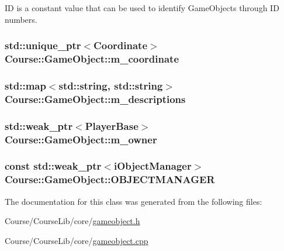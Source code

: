 I\-D is a constant value that can be used to identify Game\-Objects through I\-D numbers. 

\hypertarget{classCourse_1_1GameObject_a00d58f09e2214089825bf53b58f208b7}{
\subsubsection[{m\-\_\-coordinate}]{\setlength{\rightskip}{0pt plus 5cm}std\-::unique\-\_\-ptr$<${\bf Coordinate}$>$ Course\-::\-Game\-Object\-::m\-\_\-coordinate\hspace{0.3cm}{\ttfamily [private]}}}\label{classCourse_1_1GameObject_a00d58f09e2214089825bf53b58f208b7}
\hypertarget{classCourse_1_1GameObject_a9fb3b852a067d9079ef6ca3677b8fe77}{
\subsubsection[{m\-\_\-descriptions}]{\setlength{\rightskip}{0pt plus 5cm}std\-::map$<$std\-::string, std\-::string$>$ Course\-::\-Game\-Object\-::m\-\_\-descriptions\hspace{0.3cm}{\ttfamily [private]}}}\label{classCourse_1_1GameObject_a9fb3b852a067d9079ef6ca3677b8fe77}
\hypertarget{classCourse_1_1GameObject_a2644bd9e0627fae72f8b7e628e4ee435}{
\subsubsection[{m\-\_\-owner}]{\setlength{\rightskip}{0pt plus 5cm}std\-::weak\-\_\-ptr$<${\bf Player\-Base}$>$ Course\-::\-Game\-Object\-::m\-\_\-owner\hspace{0.3cm}{\ttfamily [private]}}}\label{classCourse_1_1GameObject_a2644bd9e0627fae72f8b7e628e4ee435}
\hypertarget{classCourse_1_1GameObject_ac5517da07a7c75a17bfb89a25e8e242f}{
\subsubsection[{O\-B\-J\-E\-C\-T\-M\-A\-N\-A\-G\-E\-R}]{\setlength{\rightskip}{0pt plus 5cm}const std\-::weak\-\_\-ptr$<${\bf i\-Object\-Manager}$>$ Course\-::\-Game\-Object\-::\-O\-B\-J\-E\-C\-T\-M\-A\-N\-A\-G\-E\-R\hspace{0.3cm}{\ttfamily [private]}}}\label{classCourse_1_1GameObject_ac5517da07a7c75a17bfb89a25e8e242f}


The documentation for this class was generated from the following files\-:\begin{DoxyCompactItemize}
\item 
Course/\-Course\-Lib/core/\hyperlink{gameobject_8h}{gameobject.\-h}\item 
Course/\-Course\-Lib/core/\hyperlink{gameobject_8cpp}{gameobject.\-cpp}\end{DoxyCompactItemize}
